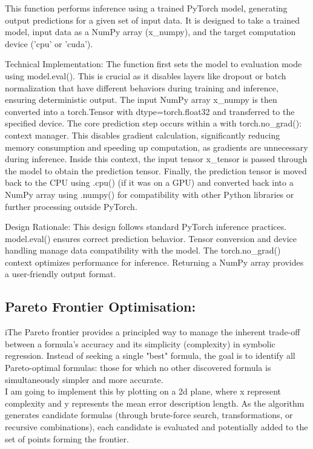 \documentclass{article}
\begin{document}
This function performs inference using a trained PyTorch model, generating output predictions for a given set of input data. It is designed to take a trained model, input data as a NumPy array (x_numpy), and the target computation device ('cpu' or 'cuda').

Technical Implementation: The function first sets the model to evaluation mode using model.eval(). This is crucial as it disables layers like dropout or batch normalization that have different behaviors during training and inference, ensuring deterministic output. The input NumPy array x_numpy is then converted into a torch.Tensor with dtype=torch.float32 and transferred to the specified device. The core prediction step occurs within a with torch.no_grad(): context manager. This disables gradient calculation, significantly reducing memory consumption and speeding up computation, as gradients are unnecessary during inference. Inside this context, the input tensor x_tensor is passed through the model to obtain the prediction tensor. Finally, the prediction tensor is moved back to the CPU using .cpu() (if it was on a GPU) and converted back into a NumPy array using .numpy() for compatibility with other Python libraries or further processing outside PyTorch.

Design Rationale: This design follows standard PyTorch inference practices. model.eval() ensures correct prediction behavior. Tensor conversion and device handling manage data compatibility with the model. The torch.no_grad() context optimizes performance for inference. Returning a NumPy array provides a user-friendly output format.\\

\subsection{Pareto Frontier Optimisation: }

iThe Pareto frontier provides a principled way to manage the inherent trade-off between a formula's accuracy and its simplicity (complexity) in symbolic regression. Instead of seeking a single "best" formula, the goal is to identify all Pareto-optimal formulas: those for which no other discovered formula is simultaneously simpler and more accurate.\\


I am going to implement this by plotting on a 2d plane, where x represent complexity and y represents the mean error description length.  As the algorithm generates candidate formulas (through brute-force search, transformations, or recursive combinations), each candidate is evaluated and potentially added to the set of points forming the frontier.\\
\end{document}
